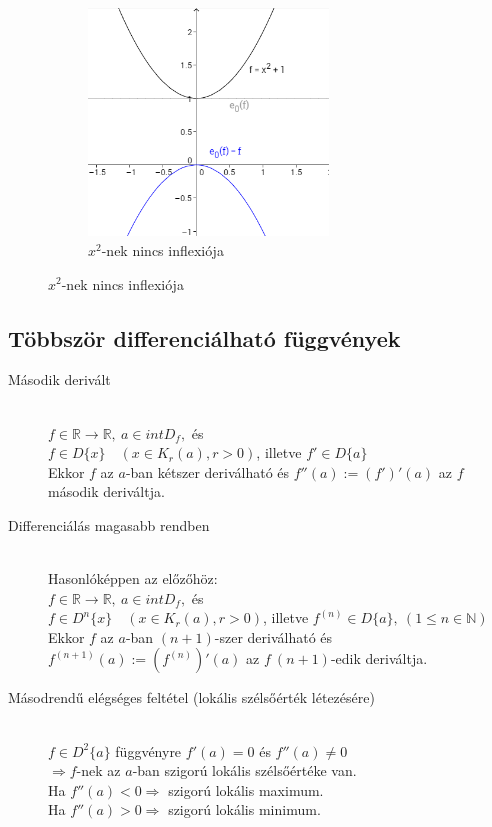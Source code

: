 \documentclass[margin=0px]{article}
\newcommand{\R}{\mathbb{R}}
\begin{document}
\begin{description}
\begin{figure}[H]
\begin{subfigure}{.33\textwidth}
						\includegraphics[width=0.7\textwidth]{img/inflexio_x2.png}
						\caption{$x^2$-nek nincs inflexiója}
					\end{subfigure}
				\end{figure}
		\end{description}
		\subsection{Többször differenciálható függvények}
		\begin{description}
			\item[Második derivált] \hfill \\
				$ f \in \R \rightarrow \R, \ a \in intD_f, $ és \\ 
				$ f \in D\{x\} \quad (x \in K_r(a), r>0)$, illetve $f' \in D\{a\}$ \\
				Ekkor $f$ az $a$-ban kétszer deriválható és $f''(a) := (f')'(a) $ az $f$ második deriváltja.
			\item[Differenciálás magasabb rendben] \hfill \\
				Hasonlóképpen az előzőhöz:\\
				$ f \in \R \rightarrow \R, \ a \in intD_f, $ és \\ 
				$ f \in D^n\{x\} \quad (x \in K_r(a), r>0)$, illetve $f^{(n)} \in D\{a\}, \ (1 \leq n \in \mathbb{N})$ \\
				Ekkor $f$ az $a$-ban $(n+1)$-szer deriválható és $f^{(n+1)}(a) := (f^{(n)})'(a) $ az $f \ (n+1)$-edik deriváltja.
			\item[Másodrendű elégséges feltétel (lokális szélsőérték létezésére)] \hfill \\
				$ f \in D^2\{a\}$ függvényre $f'(a) = 0$ és $f''(a) \neq 0 $ \\
				$ \Rightarrow f$-nek az $a$-ban szigorú lokális szélsőértéke van. \\
				Ha $f''(a) < 0 \Rightarrow $ szigorú lokális maximum. \\
				Ha $f''(a) > 0 \Rightarrow $ szigorú lokális minimum.
		\end{description}
\end{document}
